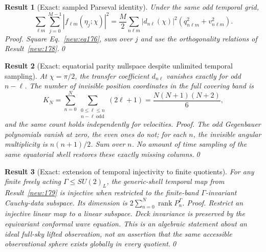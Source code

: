 \documentclass[aps,prd,onecolumn,notitlepage,groupedaddress,11pt]{revtex4-2}
\newtheorem{result}{Result}
\begin{document}
\begin{result}[\textsf{Exact}: sampled Parseval identity]\label{new:184}
Under the same odd temporal grid,
\begin{equation}\label{new:eq184}
 \sum_{\ell m}\sum_{j=0}^{M-1}|f_{\ell m}(\eta_j;\chi)|^2
 =\frac M2\sum_{n\ell m}|d_{n\ell}(\chi)|^2(q_{n\ell m}^2+v_{n\ell m}^2).
\end{equation}
\textit{Proof.} Square Eq.~\eqref{new:eq176}, sum over $j$ and use the orthogonality relations of Result~\ref{new:178}.\qed
\end{result}

\begin{result}[\textsf{Exact}: equatorial parity nullspace despite unlimited temporal sampling]\label{new:185}
At $\chi=\pi/2$, the transfer coefficient $d_{n\ell}$ vanishes exactly for odd $n-\ell$. The number of invisible \emph{position} coordinates in the full covering band is
\begin{equation}\label{new:eq185}
 K_N=\sum_{n=0}^N\sum_{\substack{0\le\ell\le n\\n-\ell\ \mathrm{odd}}}(2\ell+1)
 =\frac{N(N+1)(N+2)}6,
\end{equation}
and the same count holds independently for velocities. \textit{Proof.} The odd Gegenbauer polynomials vanish at zero, the even ones do not; for each $n$, the invisible angular multiplicity is $n(n+1)/2$. Sum over $n$. No amount of time sampling of the \emph{same} equatorial shell restores these exactly missing columns.\qed
\end{result}

\begin{result}[\textsf{Exact}: extension of temporal injectivity to finite quotients]\label{new:186}
For any finite freely acting $\Gamma\le SU(2)_L$, the generic-shell temporal map from Result~\ref{new:179} is injective when restricted to the finite-band $\Gamma$-invariant Cauchy-data subspace. Its dimension is $2\sum_{n=0}^N\operatorname{rank}P_n^\Gamma$.
\textit{Proof.} Restrict an injective linear map to a linear subspace. Deck invariance is preserved by the equivariant conformal wave equation. This is an algebraic statement about an ideal full-sky lifted observation, not an assertion that the same accessible observational sphere exists globally in every quotient.\qed
\end{result}
\end{document}
